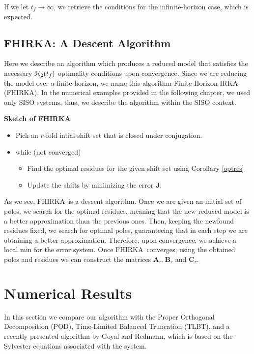 \documentclass[preprint]{elsarticle}
\theoremstyle{definition}
\theoremstyle{definition}
\def\mathcal{\EuScript}
\numberwithin{equation}{section}
\newcommand{\FH}{FHIRKA}
\newcommand{\A}{\mathbf{A}}
\newcommand{\B}{\mathbf{B}}
\newcommand{\C}{\mathbf{C}}
\newcommand{\J}{\mathbf{J}}
\newcommand{\tf}{t_f}
\newcommand{\ch}{\mathcal{H}}
\begin{document}
If we let ${\tf}\to \infty$, we retrieve the conditions for the infinite-horizon case, which is expected.\\
\subsection{\FH: A Descent Algorithm}
Here we describe an algorithm which produces a reduced model that satisfies the necessary $\ch_2({\tf})$ optimality conditions upon convergence. Since we are reducing the model over a finite horizon, we name this algorithm Finite Horizon IRKA (\FH). In the numerical examples provided in the following chapter, we used only SISO systems, thus, we describe the algorithm within the SISO context.

\begin{framed}
\textbf{Sketch of \FH}
 \begin{itemize}
	\item Pick an $r$-fold intial shift set that is closed under conjugation.%
	
	\item while (not converged)
	\begin{itemize}
	\item Find the optimal residues for the given shift set using Corollary \ref{optres}
	\item Update the shifts by minimizing the error $\J$.
\end{itemize}
\end{itemize}
\end{framed}
As we see, \FH \ is a descent algorithm. Once we are given an initial set of poles, we search for the optimal residues, meaning that the new reduced model is a better approximation than the previous ones. Then, keeping the newfound residues fixed, we search for optimal poles, guaranteeing that in each step we are obtaining a better approximation. Therefore, upon convergence, we achieve a local min for the error system. 
Once \FH\   converges, using the obtained poles and residues we can construct the matrices $\A_r, \B_r$ and $\C_r$.

\section{Numerical Results}  \label{sec:num}
In this section we compare our algorithm with the Proper Orthogonal Decomposition (POD), Time-Limited Balanced Truncation (TLBT), and a recently presented algorithm by Goyal and Redmann, which is based on the Sylvester equations associated with the system\cite{GoyR17}. 
\end{document}
